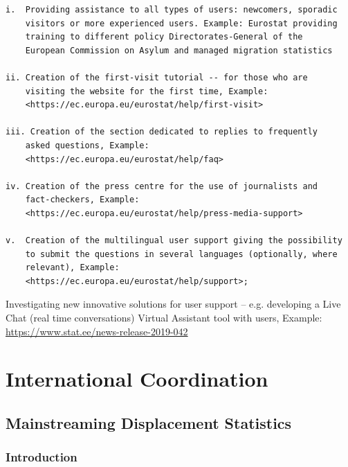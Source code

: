 \documentclass[
]{article}
\begin{document}
\begin{verbatim}
i.  Providing assistance to all types of users: newcomers, sporadic
    visitors or more experienced users. Example: Eurostat providing
    training to different policy Directorates-General of the
    European Commission on Asylum and managed migration statistics

ii. Creation of the first-visit tutorial -- for those who are
    visiting the website for the first time, Example:
    <https://ec.europa.eu/eurostat/help/first-visit>

iii. Creation of the section dedicated to replies to frequently
    asked questions, Example:
    <https://ec.europa.eu/eurostat/help/faq>

iv. Creation of the press centre for the use of journalists and
    fact-checkers, Example:
    <https://ec.europa.eu/eurostat/help/press-media-support>

v.  Creation of the multilingual user support giving the possibility
    to submit the questions in several languages (optionally, where
    relevant), Example:
    <https://ec.europa.eu/eurostat/help/support>;
\end{verbatim}

Investigating new innovative solutions for user support -- e.g.
developing a Live Chat (real time conversations) Virtual Assistant tool
with users, Example: \url{https://www.stat.ee/news-release-2019-042}

\hypertarget{international-coordination-1}{%
\section{International Coordination}\label{international-coordination-1}}

\hypertarget{mainstreaming-displacement-statistics-1}{%
\subsection{Mainstreaming Displacement Statistics}\label{mainstreaming-displacement-statistics-1}}

\hypertarget{introduction}{%
\subsubsection{Introduction}\label{introduction}}
\end{document}
